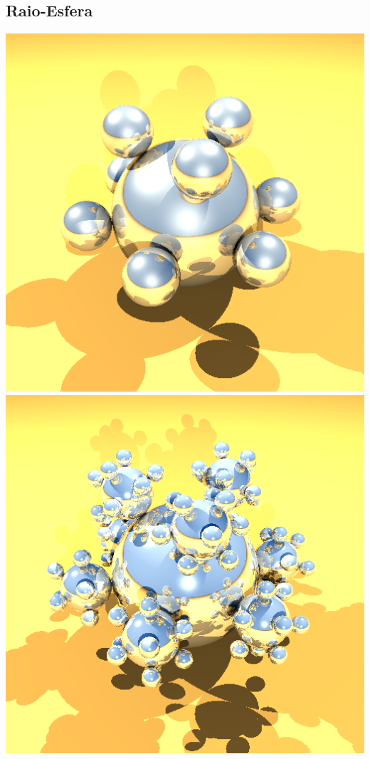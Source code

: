 \documentclass{article}
\begin{document}
    \subsection*{Raio-Esfera}

        \centering
        \includegraphics[scale=0.27]{deez_low}
        \includegraphics[scale=0.27]{deez_med} 
\end{document}
